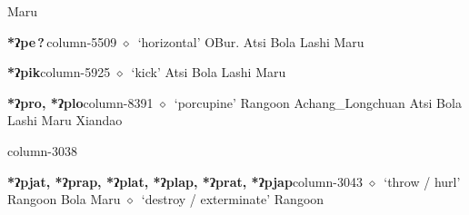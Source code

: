          Maru 
  \item {\footnotesize \textbf{*ʔpe\,?\,}}{\tiny column-5509}
         $\diamond$~`horizontal'
         OBur. 
\hspace{1ex}
         Atsi 
\hspace{1ex}
         Bola 
\hspace{1ex}
         Lashi 
\hspace{1ex}
         Maru 
  \item {\footnotesize \textbf{*ʔpik}}{\tiny column-5925}
         $\diamond$~`kick'
         Atsi 
\hspace{1ex}
         Bola 
\hspace{1ex}
         Lashi 
\hspace{1ex}
         Maru 
  \item {\footnotesize \textbf{*ʔpro, *ʔplo}}{\tiny column-8391}
         $\diamond$~`porcupine'
         Rangoon 
\hspace{1ex}
         Achang\_Longchuan 
\hspace{1ex}
         Atsi 
\hspace{1ex}
         Bola 
\hspace{1ex}
         Lashi 
\hspace{1ex}
         Maru 
\hspace{1ex}
         Xiandao 
  \item {\footnotesize \textbf{}}{\tiny column-3038}
  \item {\footnotesize \textbf{*ʔpjat, *ʔprap, *ʔplat, *ʔplap, *ʔprat, *ʔpjap}}{\tiny column-3043}
         $\diamond$~`throw / hurl'
         Rangoon 
\hspace{1ex}
         Bola 
\hspace{1ex}
         Maru 
\hspace{1ex}
         $\diamond$~`destroy / exterminate'
         Rangoon 
\hspace{1ex}

